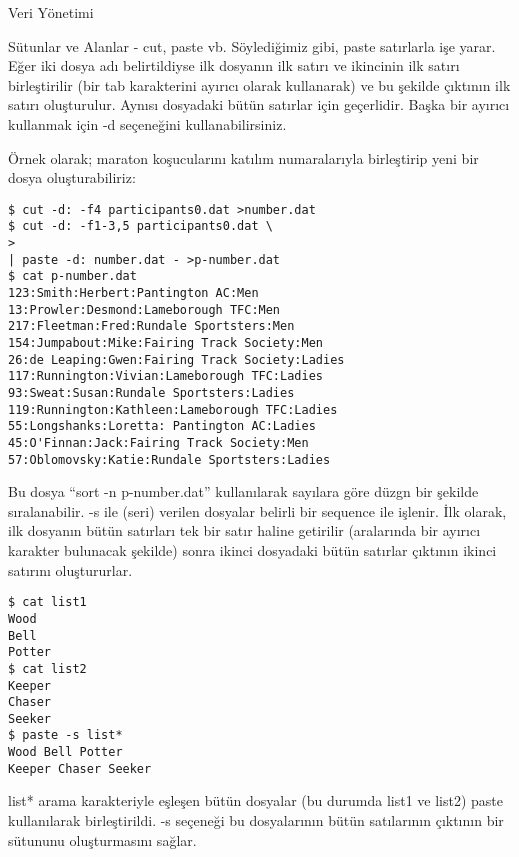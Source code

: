\begin{section}{Veri Yönetimi}
\begin{subsection}{Sütunlar ve Alanlar - cut, paste vb.}
Söylediğimiz gibi, paste satırlarla işe yarar. Eğer iki dosya adı belirtildiyse ilk dosyanın ilk satırı ve ikincinin ilk satırı birleştirilir (bir tab karakterini ayırıcı olarak kullanarak) ve bu şekilde çıktının ilk satırı oluşturulur. Aynısı dosyadaki bütün satırlar için geçerlidir. Başka bir ayırıcı kullanmak için -d seçeneğini kullanabilirsiniz.

Örnek olarak; maraton koşucularını katılım numaralarıyla birleştirip yeni bir dosya oluşturabiliriz:
\begin{verbatim}
$ cut -d: -f4 participants0.dat >number.dat 
$ cut -d: -f1-3,5 participants0.dat \ 
> 
| paste -d: number.dat - >p-number.dat 
$ cat p-number.dat 
123:Smith:Herbert:Pantington AC:Men 
13:Prowler:Desmond:Lameborough TFC:Men 
217:Fleetman:Fred:Rundale Sportsters:Men 
154:Jumpabout:Mike:Fairing Track Society:Men 
26:de Leaping:Gwen:Fairing Track Society:Ladies 
117:Runnington:Vivian:Lameborough TFC:Ladies 
93:Sweat:Susan:Rundale Sportsters:Ladies 
119:Runnington:Kathleen:Lameborough TFC:Ladies 
55:Longshanks:Loretta: Pantington AC:Ladies 
45:O'Finnan:Jack:Fairing Track Society:Men 
57:Oblomovsky:Katie:Rundale Sportsters:Ladies
\end{verbatim}

Bu dosya “sort -n p-number.dat” kullanılarak sayılara göre düzgn bir şekilde sıralanabilir. -s ile (seri) verilen dosyalar belirli bir sequence ile işlenir. İlk olarak, ilk dosyanın bütün satırları tek bir satır haline getirilir (aralarında bir ayırıcı karakter bulunacak şekilde) sonra ikinci dosyadaki bütün satırlar çıktının ikinci satırını oluştururlar.
\begin{verbatim}
$ cat list1
Wood
Bell
Potter
$ cat list2
Keeper
Chaser
Seeker
$ paste -s list*
Wood Bell Potter
Keeper Chaser Seeker
\end{verbatim}

list* arama karakteriyle eşleşen bütün dosyalar (bu durumda list1 ve list2) paste kullanılarak birleştirildi. -s seçeneği bu dosyalarının bütün satılarının çıktının bir sütununu oluşturmasını sağlar. 


\end{subsection}
\end{section}
